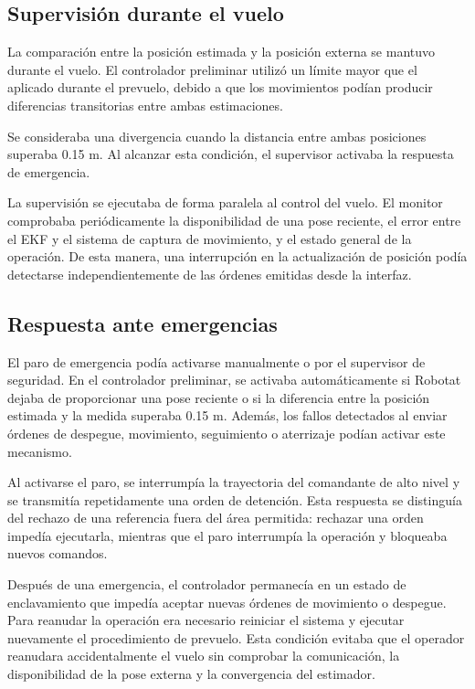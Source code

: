 \subsection{Supervisión durante el vuelo}

La comparación entre la posición estimada y la posición externa se mantuvo durante el vuelo. El controlador preliminar utilizó un límite mayor que el aplicado durante el prevuelo, debido a que los movimientos podían producir diferencias transitorias entre ambas estimaciones.

Se consideraba una divergencia cuando la distancia entre ambas posiciones superaba 0.15 m. Al alcanzar esta condición, el supervisor activaba la respuesta de emergencia.

La supervisión se ejecutaba de forma paralela al control del vuelo. El monitor comprobaba periódicamente la disponibilidad de una pose reciente, el error entre el EKF y el sistema de captura de movimiento, y el estado general de la operación. De esta manera, una interrupción en la actualización de posición podía detectarse independientemente de las órdenes emitidas desde la interfaz.

\subsection{Respuesta ante emergencias}

El paro de emergencia podía activarse manualmente o por el supervisor de seguridad. En el controlador preliminar, se activaba automáticamente si Robotat dejaba de proporcionar una pose reciente o si la diferencia entre la posición estimada y la medida superaba 0.15 m. Además, los fallos detectados al enviar órdenes de despegue, movimiento, seguimiento o aterrizaje podían activar este mecanismo.

Al activarse el paro, se interrumpía la trayectoria del comandante de alto nivel y se transmitía repetidamente una orden de detención. Esta respuesta se distinguía del rechazo de una referencia fuera del área permitida: rechazar una orden impedía ejecutarla, mientras que el paro interrumpía la operación y bloqueaba nuevos comandos.

Después de una emergencia, el controlador permanecía en un estado de enclavamiento que impedía aceptar nuevas órdenes de movimiento o despegue. Para reanudar la operación era necesario reiniciar el sistema y ejecutar nuevamente el procedimiento de prevuelo. Esta condición evitaba que el operador reanudara accidentalmente el vuelo sin comprobar la comunicación, la disponibilidad de la pose externa y la convergencia del estimador.

